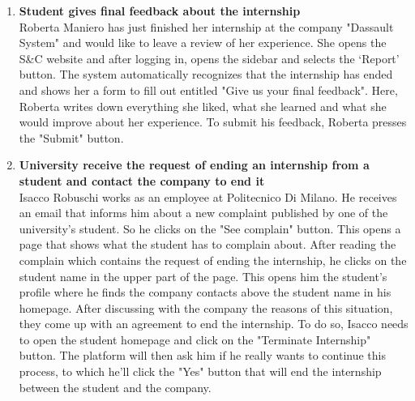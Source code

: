 \begin{enumerate}
      \item \textbf{Student gives final feedback about the internship}\\
      Roberta Maniero has just finished her internship at the company "Dassault System" and would like to leave a review of her experience. She opens the S\&C website and after logging in, opens the sidebar and selects the ‘Report’ button.
      The system automatically recognizes that the internship has ended and shows her a form to fill out entitled "Give us your final feedback". Here, Roberta writes down everything she liked, what she learned and what she would improve about her experience. To submit his feedback, Roberta presses the "Submit" button.


      \item \textbf{University receive the request of ending an internship from a student and contact the company to end it}\\
      Isacco Robuschi works as an employee at Politecnico Di Milano. He receives an email that informs him about a new complaint published by one of the university's student. So he clicks on the "See complain" button. This opens a page that shows what the student has to complain about. After reading the complain which contains the request of ending the internship, he clicks on the student name in the upper part of the page. This opens him the student's profile where he finds the company contacts above the student name in his homepage. After discussing with the company the reasons of this situation, they come up with an agreement to end the internship. To do so, Isacco needs to open the student homepage and click on the "Terminate Internship" button. The platform will then ask him if he really wants to continue this process, to which he'll click the "Yes" button that will end the internship between the student and the company.      


\end{enumerate}
